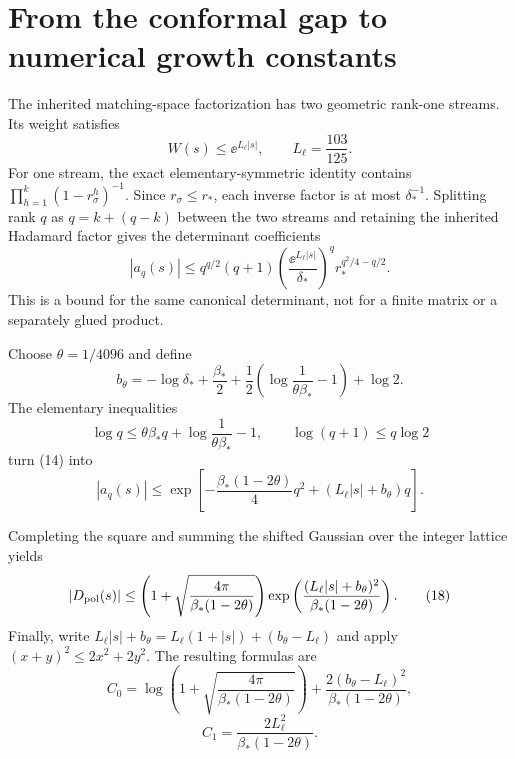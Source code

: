 \section{From the conformal gap to numerical growth constants}

The inherited matching-space factorization has two geometric rank-one
streams.  Its weight satisfies
\[
 W(s)\le \ee^{L_\ell|s|},
 \qquad L_\ell=\frac{103}{125}.
 \tag{13}
\]
For one stream, the exact elementary-symmetric identity contains
\(\prod_{h=1}^k(1-r_\sigma^h)^{-1}\).  Since
\(r_\sigma\le r_*\), each inverse factor is at most \(\delta_*^{-1}\).
Splitting rank \(q\) as \(q=k+(q-k)\) between the two streams and retaining
the inherited Hadamard factor gives the determinant coefficients
\[
 |a_q(s)|\le q^{q/2}(q+1)
 \left(\frac{\ee^{L_\ell|s|}}{\delta_*}\right)^q
 r_*^{q^2/4-q/2}.
 \tag{14}
\]
This is a bound for the same canonical determinant, not for a finite matrix or
a separately glued product.

Choose \(\theta=1/4096\) and define
\[
 b_\theta=-\log\delta_*+\frac{\beta_*}{2}
 +\frac12\left(\log\frac1{\theta\beta_*}-1\right)+\log2.
 \tag{15}
\]
The elementary inequalities
\[
 \log q\le \theta\beta_*q+
 \log\frac1{\theta\beta_*}-1,
 \qquad
 \log(q+1)\le q\log2
 \tag{16}
\]
turn (14) into
\[
 |a_q(s)|\le
 \exp\left[-\frac{\beta_*(1-2\theta)}4q^2
 +(L_\ell|s|+b_\theta)q\right].
 \tag{17}
\]

Completing the square and summing the shifted Gaussian over the integer
lattice yields
\[
 |D_{\mathrm{pol}}(s)|\le
 \left(1+\sqrt{\frac{4\pi}{\beta_*(1-2\theta)}}\right)
 \exp\left(
 \frac{(L_\ell|s|+b_\theta)^2}{\beta_*(1-2\theta)}
 \right).
 \tag{18}
\]
Finally, write
\(L_\ell|s|+b_\theta=L_\ell(1+|s|)+(b_\theta-L_\ell)\) and apply
\((x+y)^2\le2x^2+2y^2\).  The resulting formulas are
\[
 C_0=
 \log\left(1+\sqrt{\frac{4\pi}{\beta_*(1-2\theta)}}\right)
 +\frac{2(b_\theta-L_\ell)^2}{\beta_*(1-2\theta)},
 \tag{19}
\]
\[
 C_1=\frac{2L_\ell^2}{\beta_*(1-2\theta)}.
 \tag{20}
\]

